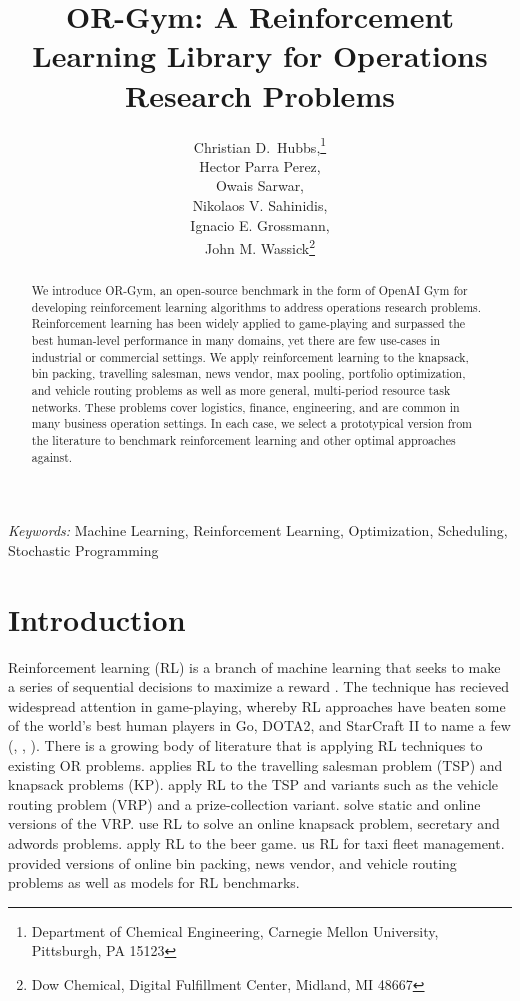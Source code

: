 \documentclass[12pt]{article}
\title{OR-Gym: A Reinforcement Learning Library for Operations Research Problems}
\author{
	Christian D.~Hubbs,\thanks{Department of Chemical Engineering, Carnegie Mellon University, Pittsburgh, PA 15123} \\
	Hector Parra Perez,\footnotemark[1] \\
	Owais Sarwar,\footnotemark[1]\\
	Nikolaos V. Sahinidis,\footnotemark[1] \\
	Ignacio E. Grossmann,\footnotemark[1] \\
	John M. Wassick\thanks{Dow Chemical, Digital Fulfillment Center, Midland, MI 48667}
}
\providecommand{\keywords}[1]{\textit{Keywords:} #1}
\begin{document}
\maketitle

\begin{abstract}
We introduce OR-Gym, an open-source benchmark in the form of OpenAI Gym for developing reinforcement learning algorithms to address operations research problems.
Reinforcement learning has been widely applied to game-playing and surpassed the best human-level performance in many domains, yet there are few use-cases in industrial or commercial settings.
We apply reinforcement learning to the knapsack, bin packing, travelling salesman, news vendor, max pooling, portfolio optimization, and vehicle routing problems as well as more general, multi-period resource task networks. 
These problems cover logistics, finance, engineering, and are common in many business operation settings.
In each case, we select a prototypical version from the literature to benchmark reinforcement learning and other optimal approaches against. 
\end{abstract}

\keywords{Machine Learning, Reinforcement Learning, Optimization, Scheduling, Stochastic Programming}

\section{Introduction}

Reinforcement learning (RL) is a branch of machine learning that seeks to make a series of sequential decisions to maximize a reward \citep{Sutton2018}.
The technique has recieved widespread attention in game-playing, whereby RL approaches have beaten some of the world's best human players in Go, DOTA2, and StarCraft II to name a few (\citet{Silver2017}, \citet{Berner2010a}, \citet{Vinyals2019}). 
There is a growing body of literature that is applying RL techniques to existing OR problems.
\citet{Bello2019} applies RL to the travelling salesman problem (TSP) and knapsack problems (KP). 
\citet{Kool2019} apply RL to the TSP and variants such as the vehicle routing problem (VRP) and a prize-collection variant. 
\citet{Nazari2018} solve static and online versions of the VRP.
\citet{Kong2019} use RL to solve an online knapsack problem, secretary and adwords problems.
\citet{Oroojlooyjadid2017} apply RL to the beer game.
\citet{Lin2018} us RL for taxi fleet management. 
\citet{Balaji2019} provided versions of online bin packing, news vendor, and vehicle routing problems as well as models for RL benchmarks.
\end{document}
